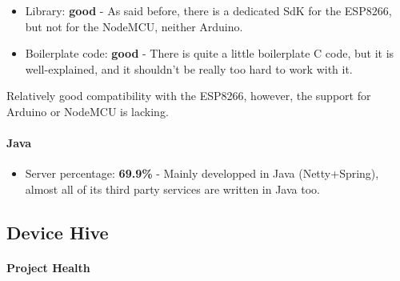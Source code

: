 \documentclass{article}
\begin{document}
\begin{itemize}
\item Library: \textbf{good} - As said before, there is a dedicated SdK for the ESP8266, but not for the NodeMCU, neither Arduino.
\item Boilerplate code: \textbf{good} - There is quite a little boilerplate C code, but it is well-explained, and it shouldn't be really too hard to work with it.
\end{itemize}

Relatively good compatibility with the ESP8266, however, the support for Arduino or NodeMCU is lacking.

\paragraph{Java} 

\begin{itemize}
\item Server percentage: \textbf{69.9\%} - Mainly developped in Java (Netty+Spring), almost all of its third party services are written in Java too.
\end{itemize}

\subsection{Device Hive}

\paragraph{Project Health}
\end{document}
